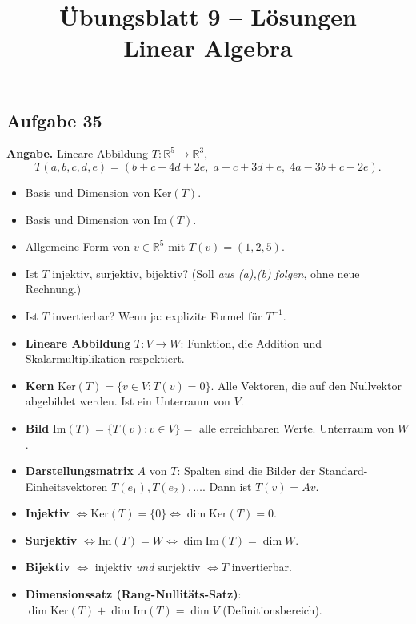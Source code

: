 \documentclass[a4paper,12pt]{article}
\title{\"Ubungsblatt 9 -- L\"osungen \\ \large Linear Algebra}
\author{}
\date{}
\begin{document}
\maketitle

\subsection*{Aufgabe 35}

\textbf{Angabe.} Lineare Abbildung $T \colon \mathbb{R}^5 \to \mathbb{R}^3$,
\[
T(a, b, c, d, e) = (b + c + 4d + 2e,\; a + c + 3d + e,\; 4a - 3b + c - 2e).
\]
\begin{itemize}[nosep]
\item[(a)] Basis und Dimension von $\text{Ker}(T)$.
\item[(b)] Basis und Dimension von $\text{Im}(T)$.
\item[(c)] Allgemeine Form von $v \in \mathbb{R}^5$ mit $T(v) = (1, 2, 5)$.
\item[(d)] Ist $T$ injektiv, surjektiv, bijektiv? (Soll \emph{aus (a),(b) folgen}, ohne neue Rechnung.)
\item[(e)] Ist $T$ invertierbar? Wenn ja: explizite Formel f\"ur $T^{-1}$.
\end{itemize}

\begin{begriffe}
\begin{itemize}[leftmargin=*, nosep]
    \item \textbf{Lineare Abbildung} $T \colon V \to W$: Funktion, die Addition und Skalarmultiplikation respektiert.
    \item \textbf{Kern} $\text{Ker}(T) = \{v \in V : T(v) = 0\}$. Alle Vektoren, die auf den Nullvektor abgebildet werden. Ist ein Unterraum von $V$.
    \item \textbf{Bild} $\text{Im}(T) = \{T(v) : v \in V\} = $ alle erreichbaren Werte. Unterraum von $W$.
    \item \textbf{Darstellungsmatrix} $A$ von $T$: Spalten sind die Bilder der Standard-Einheitsvektoren $T(e_1), T(e_2), \dots$. Dann ist $T(v) = Av$.
    \item \textbf{Injektiv} $\iff \text{Ker}(T) = \{0\} \iff \dim \text{Ker}(T) = 0$.
    \item \textbf{Surjektiv} $\iff \text{Im}(T) = W \iff \dim \text{Im}(T) = \dim W$.
    \item \textbf{Bijektiv} $\iff$ injektiv \emph{und} surjektiv $\iff T$ invertierbar.
    \item \textbf{Dimensionssatz (Rang-Nullit\"ats-Satz)}: $\dim \text{Ker}(T) + \dim \text{Im}(T) = \dim V$ (Definitionsbereich).
\end{itemize}
\end{begriffe}
\end{document}
